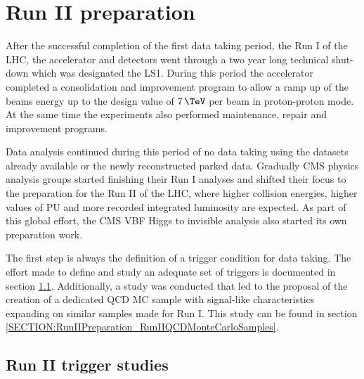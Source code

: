\chapter{Run II preparation}
\label{CHAPTER:RunIIPreparation}



After the successful completion of the first data taking period, the  Run I of the \gls{LHC}, the accelerator and detectors went through a two year long technical shut-down which was designated the \gls{LS1}. During this period the accelerator completed a consolidation and improvement program to allow a ramp up of the beams energy up to the design value of $7\,\TeV$ per beam in proton-proton mode. At the same time the experiments also performed maintenance, repair and improvement programs. 

Data analysis continued during this period of no data taking using the datasets already available or the newly reconstructed parked data. Gradually \gls{CMS} physics analysis groups started finishing their Run I analyses and shifted their focus to the preparation for the Run II of the \gls{LHC}, where higher collision energies, higher values of \gls{PU} and more recorded integrated luminosity are expected. As part of this global effort, the \gls{CMS} \gls{VBF} Higgs to invisible analysis also started its own preparation work. 

The first step is always the definition of a trigger condition for data taking. The effort made to define and study an adequate set of triggers is documented in section \ref{SECTION:RunIITriggerStudies}. Additionally, a study was conducted that led to the proposal of the creation of a dedicated \gls{QCD} \gls{MC} sample with signal-like characteristics expanding on similar samples made for Run I. This study can be found in section \ref{SECTION:RunIIPreparation_RunIIQCDMonteCarloSamples}.

\section{Run II trigger studies}
\label{SECTION:RunIITriggerStudies}

